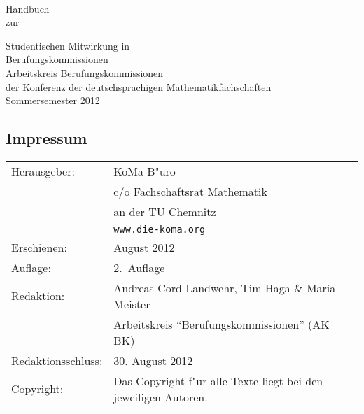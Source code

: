\documentclass[10pt,twoside,a5paper,openright]{book}
\begin{document}
\frontmatter
{}
\newpage
\thispagestyle{empty}~
\newpage


\begin{titlepage}
\begin{flushright}\sffamily
	\vspace*{1cm}
	{\Huge{Handbuch}}\\
	\vspace{2.0cm}
	{\large zur}\smallskip\par
	{\huge{Studentischen Mitwirkung in}\medskip \\
	{\huge Berufungskommissionen}} \\
	\vspace{2ex}
	\vfill
	{\large{Arbeitskreis Berufungskommissionen}\smallskip \\ 
	{\large{der Konferenz der deutschsprachigen Mathematikfachschaften}}\\
	\vspace{3cm}
	{\Large Sommersemester 2012}}\\
	\vspace{14ex}
\end{flushright}
\end{titlepage}


\newpage
\vspace*{\fill}
\subsection*{Impressum}

\begin{table}[h]
\footnotesize
		\begin{tabular}{ll}
		Herausgeber:				& KoMa-B"uro \\
									& c/o Fachschaftsrat Mathematik \\
									& an der TU Chemnitz \\
									& \texttt{www.die-koma.org} \\
		Erschienen:					& August 2012 \\
		Auflage:					& 2.~Auflage\\
		Redaktion:					& Andreas Cord-Landwehr, Tim Haga \& Maria Meister \\
									& Arbeitskreis "`Berufungskommissionen"' (AK BK) \\ 
		Redaktionsschluss:			& 30. August 2012 \\
		Copyright:					& Das Copyright f"ur alle Texte liegt bei den jeweiligen Autoren. \\
		\end{tabular}
\end{table}
\end{document}
